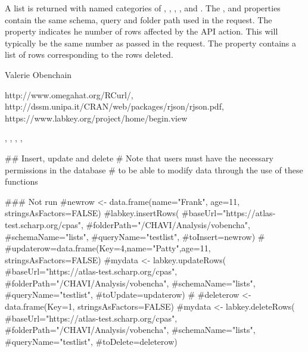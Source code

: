 \documentclass{book}
\begin{document}
\begin{Value}
A list is returned with named categories of , , , ,  and .
The ,  and  properties contain the same schema, query 
and folder path used in the request.  The
 property indicates he number of rows affected by the API action. This will typically be the same
number as passed in the request. The  property contains a list of rows corresponding to the rows
deleted.
\end{Value}
\begin{Author}\relax
Valerie Obenchain
\end{Author}
\begin{References}\relax
http://www.omegahat.org/RCurl/, \\
http://dssm.unipa.it/CRAN/web/packages/rjson/rjson.pdf,\\
https://www.labkey.org/project/home/begin.view
\end{References}
\begin{SeeAlso}\relax
{}, , , 
, 
\end{SeeAlso}
\begin{Examples}
\begin{ExampleCode}
## Insert, update and delete
# Note that users must have the necessary permissions in the database
# to be able to modify data through the use of these functions

### Not run
#newrow <- data.frame(name="Frank", age=11, stringsAsFactors=FALSE)
#labkey.insertRows(
#baseUrl="https://atlas-test.scharp.org/cpas", 
#folderPath="/CHAVI/Analysis/vobencha", 
#schemaName="lists", 
#queryName="testlist", 
#toInsert=newrow)
#
#updaterow=data.frame(Key=4,name="Patty",age=11, stringsAsFactors=FALSE)
#mydata <- labkey.updateRows(
#baseUrl="https://atlas-test.scharp.org/cpas", 
#folderPath="/CHAVI/Analysis/vobencha", 
#schemaName="lists", 
#queryName="testlist", 
#toUpdate=updaterow)
#
#deleterow <- data.frame(Key=1, stringsAsFactors=FALSE)
#mydata <- labkey.deleteRows(
#baseUrl="https://atlas-test.scharp.org/cpas", 
#folderPath="/CHAVI/Analysis/vobencha", 
#schemaName="lists", 
#queryName="testlist", 
#toDelete=deleterow)

\end{ExampleCode}
\end{Examples}
\end{document}
